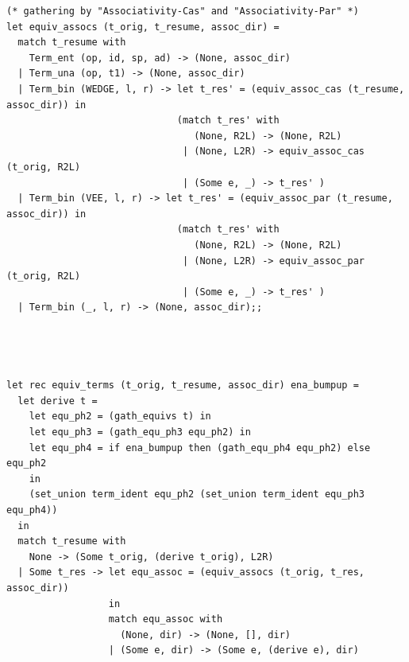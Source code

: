 \documentclass[12pt]{article}
\begin{document}
\begin{tiny}
\begin{verbatim}
(* gathering by "Associativity-Cas" and "Associativity-Par" *)
let equiv_assocs (t_orig, t_resume, assoc_dir) =
  match t_resume with
    Term_ent (op, id, sp, ad) -> (None, assoc_dir)
  | Term_una (op, t1) -> (None, assoc_dir)
  | Term_bin (WEDGE, l, r) -> let t_res' = (equiv_assoc_cas (t_resume, assoc_dir)) in
                              (match t_res' with
                                 (None, R2L) -> (None, R2L)
                               | (None, L2R) -> equiv_assoc_cas (t_orig, R2L)
                               | (Some e, _) -> t_res' )
  | Term_bin (VEE, l, r) -> let t_res' = (equiv_assoc_par (t_resume, assoc_dir)) in
                              (match t_res' with
                                 (None, R2L) -> (None, R2L)
                               | (None, L2R) -> equiv_assoc_par (t_orig, R2L)
                               | (Some e, _) -> t_res' )
  | Term_bin (_, l, r) -> (None, assoc_dir);;




let rec equiv_terms (t_orig, t_resume, assoc_dir) ena_bumpup =
  let derive t =
    let equ_ph2 = (gath_equivs t) in
    let equ_ph3 = (gath_equ_ph3 equ_ph2) in
    let equ_ph4 = if ena_bumpup then (gath_equ_ph4 equ_ph2) else equ_ph2
    in
    (set_union term_ident equ_ph2 (set_union term_ident equ_ph3 equ_ph4))
  in    
  match t_resume with
    None -> (Some t_orig, (derive t_orig), L2R)
  | Some t_res -> let equ_assoc = (equiv_assocs (t_orig, t_res, assoc_dir))
                  in
                  match equ_assoc with
                    (None, dir) -> (None, [], dir)
                  | (Some e, dir) -> (Some e, (derive e), dir)



\end{verbatim}
\end{tiny}
\end{document}
